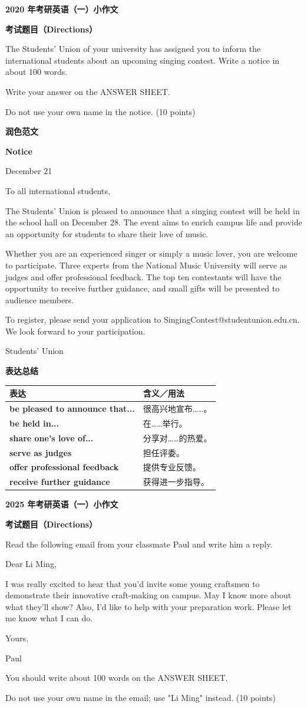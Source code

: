 \documentclass[a4paper,12pt]{article}
\newcommand{\pageheading}[1]{%
  \begin{center}
    {\fontsize{16pt}{20pt}\selectfont\bfseries\color{navy}#1}
  \end{center}
  \vspace{2mm}
}
\newcommand{\sectionlabel}[1]{%
  \vspace{1.5mm}
  {\fontsize{11pt}{14pt}\selectfont\bfseries\color{navy}#1\par}
  \vspace{1mm}
}
\newenvironment{promptbox}{%
  \begin{tcolorbox}[colback=lightgray,colframe=rulegray,boxrule=.35pt,arc=.5mm,
  left=2.2mm,right=2.2mm,top=1.4mm,bottom=1.4mm,before skip=0pt,after skip=1mm]
  \fontsize{11pt}{13.4pt}\selectfont
  \RaggedRight
}{%
  \end{tcolorbox}
}
\newenvironment{essaybody}{%
  \fontsize{14pt}{20pt}\selectfont
  \RaggedRight
  \setlength{\parskip}{5pt}
}{\par}
\newcommand{\expressions}[1]{%
  \sectionlabel{表达总结}
  {\fontsize{10.8pt}{13.2pt}\selectfont
  \begin{tabularx}{\textwidth}{>{\RaggedRight\arraybackslash}p{0.46\textwidth} >{\RaggedRight\arraybackslash}X}
  \toprule
  \textbf{表达} & \textbf{含义／用法}\\
  \midrule
  #1
  \bottomrule
  \end{tabularx}}
}
\newcommand{\exprow}[2]{\textbf{#1} & #2\\}
\newcommand{\noticeissuer}[1]{%
  \par\vspace{2mm}\begin{flushright}\fontsize{14pt}{20pt}\selectfont #1\end{flushright}
}
\begin{document}
\newpage
\thispagestyle{fancy}
\pageheading{2020 年考研英语（一）小作文}
\sectionlabel{考试题目（Directions）}
\begin{promptbox}
The Students' Union of your university has assigned you to inform the international students about an upcoming singing contest. Write a notice in about 100 words.

Write your answer on the ANSWER SHEET.

Do not use your own name in the notice. (10 points)
\end{promptbox}

\sectionlabel{润色范文}
\begin{essaybody}
\begin{center}
\textbf{Notice}
\end{center}
\begin{flushright}
December 21
\end{flushright}
To all international students,

The Students' Union is pleased to announce that a singing contest will be held in the school hall on December 28. The event aims to enrich campus life and provide an opportunity for students to share their love of music.

Whether you are an experienced singer or simply a music lover, you are welcome to participate. Three experts from the National Music University will serve as judges and offer professional feedback. The top ten contestants will have the opportunity to receive further guidance, and small gifts will be presented to audience members.

To register, please send your application to SingingContest@studentunion.edu.cn. We look forward to your participation.
\noticeissuer{Students' Union}
\end{essaybody}

\expressions{
\exprow{be pleased to announce that...}{很高兴地宣布……。}
\exprow{be held in...}{在……举行。}
\exprow{share one's love of...}{分享对……的热爱。}
\exprow{serve as judges}{担任评委。}
\exprow{offer professional feedback}{提供专业反馈。}
\exprow{receive further guidance}{获得进一步指导。}
}

\newpage
\thispagestyle{fancy}
\pageheading{2025 年考研英语（一）小作文}
\sectionlabel{考试题目（Directions）}
\begin{promptbox}
Read the following email from your classmate Paul and write him a reply.

Dear Li Ming,

I was really excited to hear that you'd invite some young craftsmen to demonstrate their innovative craft-making on campus. May I know more about what they'll show? Also, I'd like to help with your preparation work. Please let me know what I can do.

Yours,

Paul

You should write about 100 words on the ANSWER SHEET.

Do not use your own name in the email; use "Li Ming" instead. (10 points)
\end{promptbox}
\end{document}
